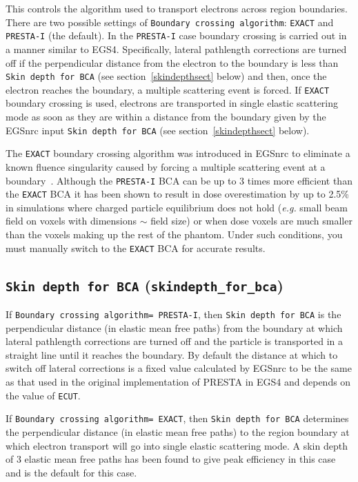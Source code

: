 \documentclass[12pt,twoside]{article}      %
\begin{document}
This controls the algorithm used to transport electrons across region
boundaries.  There are two possible settings of
{\tt Boundary crossing algorithm}: {\tt EXACT} and
{\tt PRESTA-I} (the default).  In the {\tt PRESTA-I} case boundary
crossing is carried out in a manner similar to EGS4.  Specifically, lateral
pathlength corrections are turned off if the perpendicular distance
from the electron to the boundary is less than
{\tt Skin depth for BCA} (see
section~\ref{skindepthsect} below) and then, once the electron reaches
the boundary, a multiple scattering event is forced.
If {\tt EXACT} boundary crossing is used, electrons are
transported in
single elastic scattering mode as soon as they are within a distance from
the boundary given by the EGSnrc input {\tt Skin depth for BCA} (see
section~\ref{skindepthsect} below).

The {\tt EXACT} boundary
crossing algorithm was introduced in EGSnrc to eliminate a
known fluence singularity caused by forcing a
multiple scattering event at a boundary~\cite{FS95}.  Although
the {\tt PRESTA-I} BCA can be up to 3 times more efficient than
the {\tt EXACT} BCA it has been shown to result in dose overestimation
by up to 2.5\% in simulations where charged particle equilibrium does not
hold ({\em e.g.} small beam field on voxels with dimensions $\sim$ field
size) or when dose voxels are much smaller than the voxels making up the
rest of the phantom\cite{KW06}.  Under such conditions, you must
manually switch to the {\tt EXACT} BCA for accurate results.

\subsection{{\tt  Skin depth for BCA} ({\tt skindepth\_for\_bca})}
\label{skindepthsect}

If {\tt Boundary crossing algorithm= PRESTA-I}, then
{\tt Skin depth for BCA} is the perpendicular distance
(in elastic mean free paths) from the boundary
at which lateral pathlength corrections are turned off and the particle
is transported in a straight line until it reaches the boundary.
By default the distance at which to switch off
lateral corrections is a fixed value calculated by EGSnrc to be
the same as that used in the original implementation of PRESTA in EGS4 and
depends on the value of {\tt ECUT}.

If {\tt Boundary crossing algorithm= EXACT}, then {\tt  Skin depth for BCA}
determines the perpendicular distance (in elastic mean
free paths) to the region boundary
at which electron transport will go into
single elastic scattering mode.  A skin depth of 3 elastic mean free
paths has been found to give peak efficiency in this case and is the
default for this case.
\end{document}
